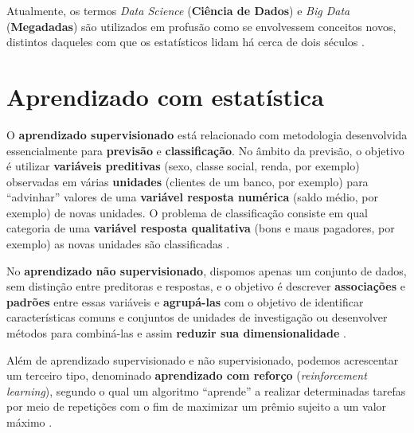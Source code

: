 \documentclass[
]{latex/krantz}
\renewenvironment{quote}{\begin{VF}}{\end{VF}}
\theoremstyle{definition}
\theoremstyle{definition}
\theoremstyle{definition}
\theoremstyle{definition}
\theoremstyle{remark}
\begin{document}
\begin{quote}
Atualmente, os termos \emph{Data Science} (\textbf{Ciência de Dados}) e \emph{Big Data} (\textbf{Megadadas}) são utilizados em profusão como se envolvessem conceitos novos, distintos daqueles com que os estatísticos lidam há cerca de dois séculos \citep[p.~1]{MorettinSinger2022}.
\end{quote}

\hypertarget{aprendizado-com-estatuxedstica}{%
\section{Aprendizado com estatística}\label{aprendizado-com-estatuxedstica}}

\begin{quote}
O \textbf{aprendizado supervisionado} está relacionado com metodologia desenvolvida essencialmente para \textbf{previsão} e \textbf{classificação}. No âmbito da previsão, o objetivo é utilizar \textbf{variáveis preditivas} (sexo, classe social, renda, por exemplo) observadas em várias \textbf{unidades} (clientes de um banco, por exemplo) para ``advinhar'' valores de uma \textbf{variável resposta numérica} (saldo médio, por exemplo) de novas unidades. O problema de classificação consiste em qual categoria de uma \textbf{variável resposta qualitativa} (bons e maus pagadores, por exemplo) as novas unidades são classificadas \citep[p.~3]{MorettinSinger2022}.
\end{quote}

\begin{quote}
No \textbf{aprendizado não supervisionado}, dispomos apenas um conjunto de dados, sem distinção entre preditoras e respostas, e o objetivo é descrever \textbf{associações} e \textbf{padrões} entre essas variáveis e \textbf{agrupá-las} com o objetivo de identificar características comuns e conjuntos de unidades de investigação ou desenvolver métodos para combiná-las e assim \textbf{reduzir sua dimensionalidade} \citep[p.~3]{MorettinSinger2022}.
\end{quote}

\begin{quote}
Além de aprendizado supervisionado e não supervisionado, podemos acrescentar um terceiro tipo, denominado \textbf{aprendizado com reforço} (\emph{reinforcement learning}), segundo o qual um algoritmo ``aprende'' a realizar determinadas tarefas por meio de repetições com o fim de maximizar um prêmio sujeito a um valor máximo \citep[p.~3]{MorettinSinger2022}.
\end{quote}
\end{document}
